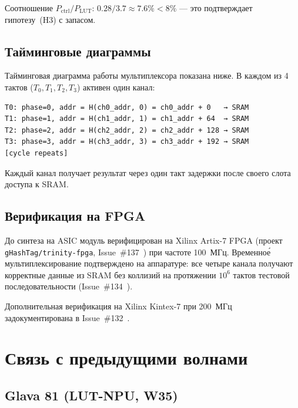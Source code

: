 Соотношение $P_{\mathrm{ctrl}} / P_{\mathrm{LUT}}$:
$0.28 / 3.7 \approx 7.6\% < 8\%$ —
это подтверждает гипотезу~(H3) с запасом.

\subsection{Тайминговые диаграммы}
\label{subsec:glava85-timing}

Тайминговая диаграмма работы мультиплексора показана ниже.
В каждом из 4 тактов ($T_0, T_1, T_2, T_3$) активен один канал:

\begin{lstlisting}[caption={Тайминг Holo-Mux-X4 (псевдокод)},
  label=lst:timing]
T0: phase=0, addr = H(ch0_addr, 0) = ch0_addr + 0   → SRAM
T1: phase=1, addr = H(ch1_addr, 1) = ch1_addr + 64  → SRAM
T2: phase=2, addr = H(ch2_addr, 2) = ch2_addr + 128 → SRAM
T3: phase=3, addr = H(ch3_addr, 3) = ch3_addr + 192 → SRAM
[cycle repeats]
\end{lstlisting}

Каждый канал получает результат через один такт задержки
после своего слота доступа к SRAM.

\subsection{Верификация на FPGA}
\label{subsec:glava85-fpga-verification}

До синтеза на ASIC модуль верифицирован на Xilinx Artix-7 FPGA
(проект \texttt{gHashTag/trinity-fpga}, Issue~\#137~\cite{trinity-fpga137})
при частоте 100~МГц.  Временно\'{е} мультиплексирование подтверждено
на аппаратуре: все четыре канала получают корректные данные из SRAM
без коллизий на протяжении $10^6$ тактов тестовой последовательности
(Issue~\#134~\cite{trinity-fpga134}).

Дополнительная верификация на Xilinx Kintex-7 при 200~МГц
задокументирована в Issue~\#132~\cite{trinity-fpga132}.

\section{Связь с предыдущими волнами}
\label{sec:glava85-prior-waves-relation}

\subsection{Glava 81 (LUT-NPU, W35)}
\label{subsec:glava85-w35}

